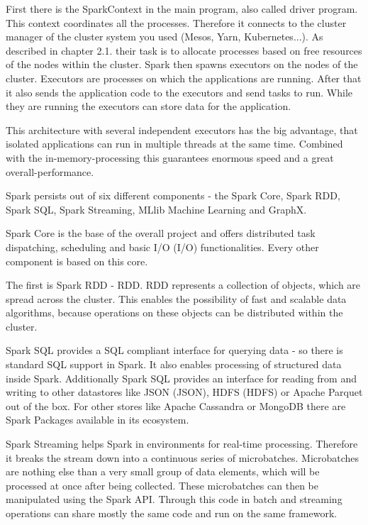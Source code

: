 First there is the SparkContext in the main program, also called driver program. This context coordinates all the processes. Therefore it connects to the cluster manager of the cluster system you used (Mesos, Yarn, Kubernetes...). As described in chapter 2.1. their task is to allocate processes based on free resources of the nodes within the cluster. Spark then spawns executors on the nodes of the cluster. Executors are processes on which the applications are running. After that it also sends the application code to the executors and send tasks to run. While they are running the executors can store data for the application.

This architecture with several independent executors has the big advantage, that isolated applications can run in multiple threads at the same time. Combined with the in-memory-processing this guarantees enormous speed and a great overall-performance.

Spark persists out of six different components - the Spark Core, Spark \acs{RDD}, Spark SQL, Spark Streaming, MLlib Machine Learning and GraphX.

Spark Core is the base of the overall project and offers distributed task dispatching, scheduling and basic \acs{I/O} (\acl{I/O}) functionalities. Every other component is based on this core.

The first is Spark RDD - \acl{RDD}. RDD represents a collection of objects, which are spread across the cluster. This enables the possibility of fast and scalable data algorithms, because operations on these objects can be distributed within the cluster.

Spark SQL provides a SQL compliant interface for querying data - so there is standard SQL support in Spark. It also enables processing of structured data inside Spark. Additionally Spark SQL provides an interface for reading from and writing to other datastores like \acs{JSON} (\acl{JSON}), \acs{HDFS} (\acl{HDFS}) or Apache Parquet out of the box. For other stores like Apache Cassandra or MongoDB there are Spark Packages available in its ecosystem.

Spark Streaming helps Spark in environments for real-time processing. Therefore it breaks the stream down into a continuous series of microbatches. Microbatches are nothing else than a very small group of data elements, which will be processed at once after being collected. These microbatches can then be manipulated using the Spark API. Through this code in batch and streaming operations can share mostly the same code and run on the same framework. 

